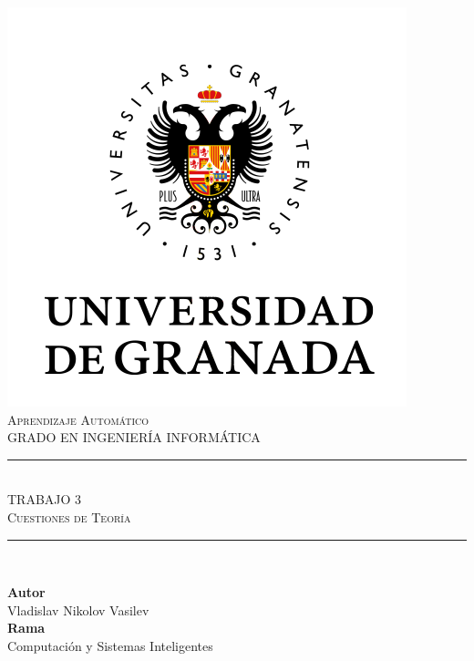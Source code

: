 \documentclass[11pt,a4paper]{article}
\newcommand{\asignatura}{Aprendizaje Automático}
\newcommand{\autor}{Vladislav Nikolov Vasilev}
\begin{document}

\begin{titlepage}

\begin{minipage}{\textwidth}

\centering

\includegraphics[scale=0.5]{img/ugr.png}\\

\textsc{\Large \asignatura{}\\[0.2cm]}
\textsc{GRADO EN INGENIERÍA INFORMÁTICA}\\[1cm]

\noindent\rule[-1ex]{\textwidth}{1pt}\\[1.5ex]
\textsc{{\Huge TRABAJO 3\\[0.5ex]}}
\textsc{{\Large Cuestiones de Teoría\\}}
\noindent\rule[-1ex]{\textwidth}{2pt}\\[3.5ex]

\end{minipage}

\vspace{0.5cm}

\begin{minipage}{\textwidth}

\centering

\textbf{Autor}\\ {\autor{}}\\[2.5ex]
\textbf{Rama}\\ {Computación y Sistemas Inteligentes}\\[2.5ex]
\vspace{0.3cm}


\end{minipage}
\end{titlepage}
\end{document}
